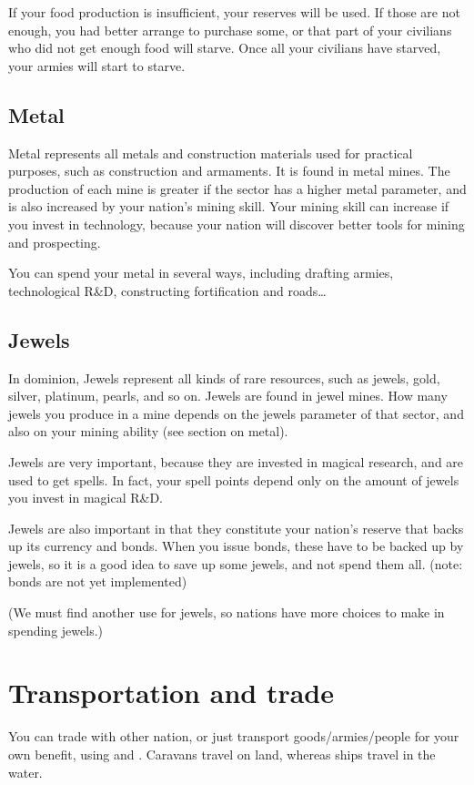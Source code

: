 If your food production is insufficient, your reserves will be used.
If those are not enough, you had better arrange to purchase some, or
that part of your civilians who did not get enough food will starve.
Once all your civilians have starved, your armies will start to
starve.

\subsection{Metal}
Metal represents all metals and construction materials used for
practical purposes, such as construction and armaments.  It is found
in metal mines.  The production of each mine is greater if the sector
has a higher metal parameter, and is also increased by your nation's
mining skill.  Your mining skill can increase if you invest in
technology, because your nation will discover better tools for mining
and prospecting.

You can spend your metal in several ways, including drafting armies,
technological R\&D, constructing fortification and roads\dots{}

\subsection{Jewels}
In dominion, Jewels represent all kinds of rare resources, such as jewels,
gold, silver, platinum, pearls, and so on.  Jewels are found in jewel
mines.  How many jewels you produce in a mine depends on the jewels
parameter of that sector, and also on your mining ability (see section
on metal).

Jewels are very important, because they are invested in magical
research, and are used to get spells.  In fact, your spell points
depend only on the amount of jewels you invest in magical R\&D.

Jewels are also important in that they constitute your nation's
reserve that backs up its currency and bonds.  When you issue bonds,
these have to be backed up by jewels, so it is a good idea to save up
some jewels, and not spend them all. (note: bonds are not yet
implemented)

(We must find another use for jewels, so nations have more choices to
make in spending jewels.)

\section{Transportation and trade}
You can trade with other nation, or just transport goods/armies/people
for your own benefit, using  and .
Caravans travel on land, whereas ships travel in the water.

